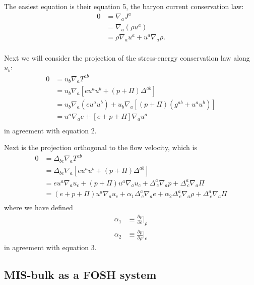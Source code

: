 \documentclass[12pt]{article}
\numberwithin{equation}{section}
\begin{document}
The easiest equation is their equation 5, the baryon current conservation law:
\begin{equation}
\begin{aligned}
0 &= \nabla_{a} J^{a} \\
&= \nabla_{a} (\rho u^a) \\
&= \rho \nabla_{a} u^a + u^a \nabla_{a} \rho. \\
\end{aligned}
\end{equation}

Next we will consider the projection of the stress-energy conservation law along $u_b$:
\begin{equation}
\begin{aligned}
0 &= u_b \nabla_{a} T^{ab} \\
&= u_b \nabla_{a} [e u^a u^b + (p + \Pi) \Delta^{ab}] \\
&= u_b \nabla_{a} (e u^a u^b) + u_b \nabla_{a} [(p + \Pi) (g^{ab} + u^a u^b)] \\
&= u^a \nabla_{a} e + [e + p + \Pi] \nabla_{a} u^a \\
\end{aligned}
\end{equation}
in agreement with \cite{Bemfica19} equation 2.

Next is the projection orthogonal to the flow velocity, which is
\begin{equation}
\begin{aligned}
0 &= \Delta_{bc} \nabla_{a} T^{ab} \\
&= \Delta_{bc} \nabla_{a} [e u^a u^b + (p + \Pi) \Delta^{ab}] \\
&= e u^a \nabla_{a} u_c + (p + \Pi) u^a \nabla_{a} u_c + \Delta^{a}_{~c} \nabla_{a} p + \Delta^{a}_{~c} \nabla_{a} \Pi \\
&= (e + p + \Pi) u^a \nabla_{a} u_c + \alpha_1 \Delta^{a}_{~c} \nabla_a e + \alpha_2 \Delta^{a}_{~c} \nabla_a \rho + \Delta^{a}_{~c} \nabla_{a} \Pi \\
\end{aligned}
\end{equation}
where we have defined
\begin{align}
\alpha_1 &\equiv \frac{\partial p}{\partial e} \Big|_\rho \\
\alpha_2 &\equiv \frac{\partial p}{\partial \rho} \Big|_e
\end{align}
in agreement with \cite{Bemfica19} equation 3.

\subsection{MIS-bulk as a FOSH system}
\end{document}
